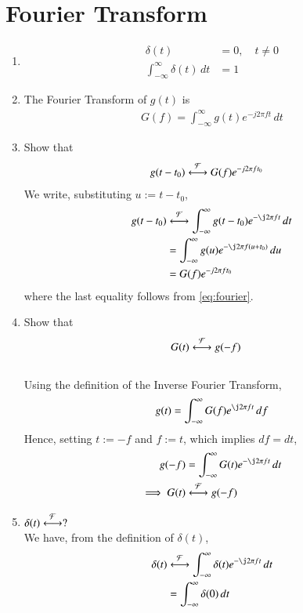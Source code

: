 \documentclass[journal,12pt,twocolumn]{IEEEtran}
\renewcommand\thesection{\arabic{section}}
\begin{document}
\section{Fourier Transform}

\begin{enumerate}[label=\thesection.\arabic*
,ref=\thesection.\theenumi]
\item
\begin{align}
\delta(t)&=0, \quad t\neq0
\\
\int_{-\infty}^{\infty}\delta(t) \, dt&= 1
\end{align}
\item The Fourier Transform of $g(t)$ is
\begin{align}
G(f)=\int_{-\infty}^{\infty}g(t)e^{-j2\pi ft}\,dt
\end{align}
\item Show that
\begin{align}
g(t-t_0)&\overset{\mathcal{F}}{ \longleftrightarrow}G(f)e^{-j2\pi ft_0}
\end{align}
\solution We write, substituting $u := t-t_0$,
\begin{align}
g(t-t_0)&\system{F}\int_{-\infty}^{\infty}
g(t-t_0)e^{-\j2\pi ft}\,dt \\
&=\int_{-\infty}^{\infty}
g(u)e^{-\j2\pi f(u + t_0)}\,du \\
&=G(f)e^{-j2\pi ft_0}
\end{align}
where the last equality follows from \eqref{eq:fourier}.
\item Show that
\begin{align}
G(t)&\overset{\mathcal{F}}{ \longleftrightarrow}g(-f)
\end{align} \\
\solution Using the definition of the Inverse Fourier Transform,
\begin{align}
g(t)=\int_{-\infty}^{\infty}G(f)e^{\j2\pi ft}\,df
\label{eq:duality}
\end{align}
Hence, setting $t := -f$ and $f := t$, which implies $df = dt$,
\begin{align}
g(-f)&=\int_{-\infty}^{\infty}G(t)e^{-\j2\pi ft}\,dt \\
\implies G(t)&\system{F}g(-f)
\end{align}
\item $\delta(t)\overset{\mathcal{F}}{ \longleftrightarrow}?$ \\
\solution We have, from the definition of $\delta(t)$,
\begin{align}
\delta(t)&\system{F}\int_{-\infty}^{\infty}\delta(t)e^{-\j2\pi ft}\, dt \\
&=\int_{-\infty}^{\infty}\delta(0)\, dt \\

\end{align}
\end{enumerate}
\end{document}
